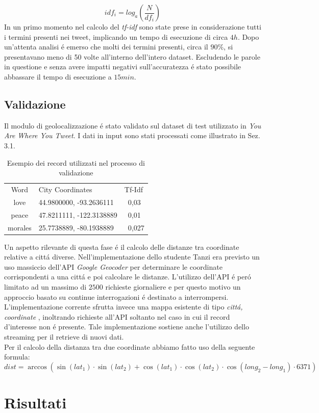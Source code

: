 \documentclass[twocolumn,10pt]{asme2ej}
\begin{document}
$$idf_i= log_{a}\left ( \frac{N}{df_i} \right )$$
In un primo momento nel calcolo del \textit{tf-idf} sono state prese in considerazione tutti i termini presenti nei tweet, implicando un tempo di esecuzione di circa $4h$. Dopo un'attenta analisi \'e emerso che molti dei termini presenti, circa il $90\%$, si presentavano meno di 50 volte all'interno dell'intero dataset. Escludendo le parole in questione e senza avere impatti negativi sull'accuratezza \'e stato possibile abbassare il tempo di esecuzione a $15 min$. 


\subsection{Validazione}

Il modulo di geolocalizzazione \'e stato validato sul dataset di test utilizzato in \textit{You Are Where You Tweet}. I dati in input sono stati processati come illustrato in Sez. 3.1. 
\begin{table}[t]
\caption{Esempio dei record utilizzati nel processo di validazione}
\begin{center}
\label{table_ASME}
\begin{tabular}{c l l}
& & \\ %
\hline
Word & City Coordinates &  Tf-Idf \\
\hline
love & 44.9800000, -93.2636111 & \ 0,03\\
peace &  47.8211111, -122.3138889 & \ 0,01 \\
morales & 25.7738889, -80.1938889 & \ 0,027 \\

\hline
\end{tabular}
\end{center}
\end{table}

Un aspetto rilevante di questa fase \'e il calcolo delle distanze tra coordinate relative a citt\'a diverse. Nell'implementazione dello studente Tanzi era previsto un uso massiccio dell'API \textit{Google Geocoder} per determinare le coordinate corrispondenti a una citt\'a e poi calcolare le distanze. L'utilizzo dell'API \'e per\'o limitato ad un massimo di $2500$ richieste giornaliere e per questo motivo un approccio basato su continue interrogazioni \'e destinato a interrompersi. L'implementazione corrente sfrutta invece una mappa esistente di tipo \textit{citt\'a, coordinate} , inoltrando richieste all'API soltanto nel caso in cui il record d'interesse non \'e presente. Tale implementazione sostiene anche l'utilizzo dello streaming per il retrieve di nuovi dati.\\Per il calcolo della distanza tra due coordinate abbiamo fatto uso della seguente formula: 
$$dist=  \arccos{\left ( \sin{\left (lat_1 \right )} \cdot \sin{\left (lat_2 \right )} + \cos{\left (lat_1 \right )} \cdot \cos{\left (lat_2 \right )} \cdot \cos{\left (long_2 - long_1 \right )} \cdot 6371 \right ) }$$


\section{Risultati}
\end{document}
